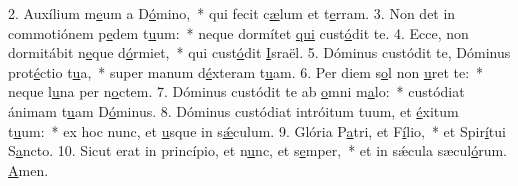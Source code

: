 2. Auxílium m\uline{e}um a D\uline{ó}mino,~* qui fecit c\uline{æ}lum et t\uline{e}rram.
3. Non det in commotiónem p\uline{e}dem t\uline{u}um:~* neque dormítet \uline{qui} cust\uline{ó}dit te.
4. Ecce, non dormitábit n\uline{e}que d\uline{ó}rmiet,~* qui cust\uline{ó}dit \uline{I}sraël.
5. Dóminus custódit te, Dóminus prot\uline{é}ctio t\uline{u}a,~* super manum d\uline{é}xteram t\uline{u}am.
6. Per diem s\uline{o}l non \uline{u}ret te:~* neque l\uline{u}na per n\uline{o}ctem.
7. Dóminus custódit te ab \uline{o}mni m\uline{a}lo:~* custódiat ánimam t\uline{u}am D\uline{ó}minus.
8. Dóminus custódiat intróitum tuum, et \uline{é}xitum t\uline{u}um:~* ex hoc nunc, et \uline{u}sque in s\uline{ǽ}culum.
9. Glória P\uline{a}tri, et F\uline{í}lio,~* et Spir\uline{í}tui S\uline{a}ncto.
10. Sicut erat in princípio, et n\uline{u}nc, et s\uline{e}mper,~* et in sǽcula sæcul\uline{ó}rum. \uline{A}men.

